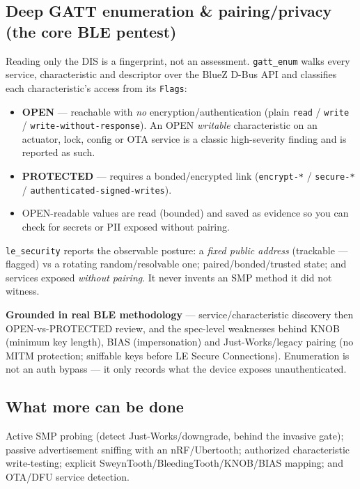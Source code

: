 \documentclass[11pt]{article}
\newif\ifintable\intablefalse
\newcommand{\code}[1]{\ifintable\texttt{#1}\else{\small\colorbox{codebg}{\texttt{#1}}}\fi}
\begin{document}
\subsection{Deep GATT enumeration \& pairing/privacy (the core BLE pentest)}
Reading only the DIS is a fingerprint, not an assessment. \code{gatt\_enum}
walks every service, characteristic and descriptor over the BlueZ D-Bus API and
classifies each characteristic's access from its \texttt{Flags}:
\begin{itemize}
  \item \textbf{OPEN} --- reachable with \emph{no} encryption/authentication
  (plain \texttt{read} / \texttt{write} / \texttt{write-without-response}). An OPEN
  \emph{writable} characteristic on an actuator, lock, config or OTA service is a
  classic high-severity finding and is reported as such.
  \item \textbf{PROTECTED} --- requires a bonded/encrypted link
  (\texttt{encrypt-*} / \texttt{secure-*} / \texttt{authenticated-signed-writes}).
  \item OPEN-readable values are read (bounded) and saved as evidence so you can
  check for secrets or PII exposed without pairing.
\end{itemize}
\code{le\_security} reports the observable posture: a \emph{fixed public address}
(trackable --- flagged) vs a rotating random/resolvable one; paired/bonded/trusted
state; and services exposed \emph{without pairing}. It never invents an SMP method
it did not witness.
\begin{callout}
\textbf{Grounded in real BLE methodology} --- service/characteristic discovery
then OPEN-vs-PROTECTED review, and the spec-level weaknesses behind KNOB (minimum
key length), BIAS (impersonation) and Just-Works/legacy pairing (no MITM
protection; sniffable keys before LE Secure Connections). Enumeration is not an
auth bypass --- it only records what the device exposes unauthenticated.
\end{callout}

\subsection{What more can be done}
Active SMP probing (detect Just-Works/downgrade, behind the invasive gate);
passive advertisement sniffing with an nRF/Ubertooth; authorized
characteristic write-testing; explicit SweynTooth/BleedingTooth/KNOB/BIAS
mapping; and OTA/DFU service detection.

\end{document}
